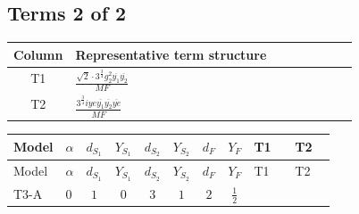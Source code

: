 \documentclass[8pt]{article}
\begin{document}
\begin{landscape}
\subsection*{Terms 2 of 2}
\begin{center}
\begin{tabular}{@{}c >{\raggedright\arraybackslash}p{0.82\linewidth}@{}}
\toprule
Column & Representative term structure \\
\midrule
T1 & \(\displaystyle \frac{\sqrt{2} \cdot 3^{\frac{3}{4}} g_{2}^{2} \overline{y_{1}} \overline{y_{2}}}{MF}\) \\
\midrule
T2 & \(\displaystyle \frac{3^{\frac{3}{4}} i ye \overline{y_{1}} \overline{y_{2}} \overline{ye}}{MF}\) \\
\midrule
\bottomrule
\end{tabular}
\end{center}
\smallskip
\tiny
\begin{longtable}{@{}llcccccc >{\raggedright\arraybackslash}p{0.21\linewidth} >{\raggedright\arraybackslash}p{0.21\linewidth}@{}}
\toprule
Model & $\alpha$ & $d_{S_1}$ & $Y_{S_1}$ & $d_{S_2}$ & $Y_{S_2}$ & $d_F$ & $Y_F$ & T1 & T2 \\
\midrule
\endfirsthead
\toprule
Model & $\alpha$ & $d_{S_1}$ & $Y_{S_1}$ & $d_{S_2}$ & $Y_{S_2}$ & $d_F$ & $Y_F$ & T1 & T2 \\
\midrule
\endhead
T3-A & $0$ & $1$ & $0$ & $3$ & $1$ & $2$ & $\frac{1}{2}$ & \scriptsize\adjustbox{max width=\linewidth}{$\begin{gathered} \frac{\sqrt{2} \cdot 3^{\frac{3}{4}} g_{2}^{2} \overline{y_{1}} \overline{y_{2}}}{3 MF}\end{gathered}$} & \scriptsize\adjustbox{max width=\linewidth}{$\begin{gathered} \frac{3^{\frac{3}{4}} i ye \overline{y_{1}} \overline{y_{2}} \overline{ye}}{12 MF}\end{gathered}$} \\
\midrule
\bottomrule
\end{longtable}
\clearpage

\end{landscape}
\end{document}
